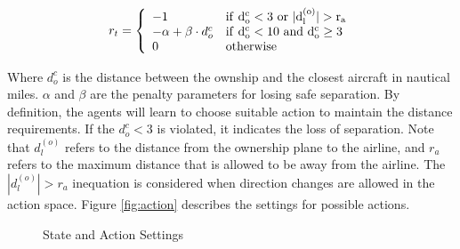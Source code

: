 \[{r_t} = \left\{ {\begin{array}{*{20}{l}}
    { - 1}&{\rm{ if } \ d_o^c < 3 \ \rm{ or } \ |d^{(o)}_l| > r_a }\\
    { - \alpha  + \beta  \cdot d_o^c}&{\rm{ if } \ d_o^c < 10 \ \rm{ and } \ d_o^c \ge 3}\\
    0&{{\rm{ otherwise }}}
    \end{array}} \right.\]

Where $d_o^c$ is the distance between the ownship and the closest aircraft in nautical miles. $\alpha $ and $\beta $ are the penalty parameters for losing safe separation. By definition, the agents will learn to choose suitable action to maintain the distance requirements. If the $d_o^c < 3$ is violated, it indicates the loss of separation. Note that $d_l^{(o)}$ refers to the distance from the ownership plane to the airline, and $r_a$ refers to the maximum distance that is allowed to be away from the airline. The $|d^{(o)}_l| > r_a$ inequation is considered when direction changes are allowed in the action space. Figure \ref{fig:action} describes the settings for possible actions.

\begin{figure}[!htbp]
    \centering
    \caption{State and Action Settings}
    \label{fig:state_action}
\end{figure}


